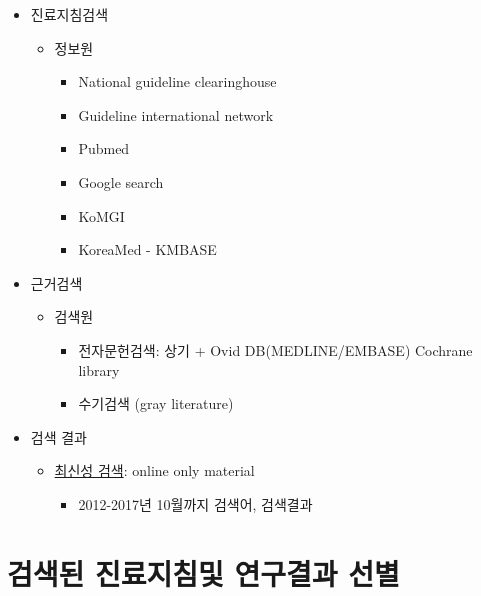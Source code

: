 \documentclass[]{book}
\providecommand{\tightlist}{%
  \setlength{\itemsep}{0pt}\setlength{\parskip}{0pt}}
\begin{document}
\begin{itemize}
\tightlist
\item
  진료지침검색

  \begin{itemize}
  \tightlist
  \item
    정보원

    \begin{itemize}
    \tightlist
    \item
      National guideline clearinghouse
    \item
      Guideline international network
    \item
      Pubmed
    \item
      Google search
    \item
      KoMGI
    \item
      KoreaMed - KMBASE
    \end{itemize}
  \end{itemize}
\item
  근거검색

  \begin{itemize}
  \tightlist
  \item
    검색원

    \begin{itemize}
    \tightlist
    \item
      전자문헌검색: 상기 + Ovid DB(MEDLINE/EMBASE) Cochrane library
    \item
      수기검색 (gray literature)
    \end{itemize}
  \end{itemize}
\item
  검색 결과

  \begin{itemize}
  \tightlist
  \item
    \href{static/SearchingResult_\%20201710.pdf}{최신성 검색}: online only material

    \begin{itemize}
    \tightlist
    \item
      2012-2017년 10월까지 검색어, 검색결과
    \end{itemize}
  \end{itemize}
\end{itemize}

\hypertarget{section-55}{%
\section{검색된 진료지침및 연구결과 선별}\label{section-55}}
\end{document}
